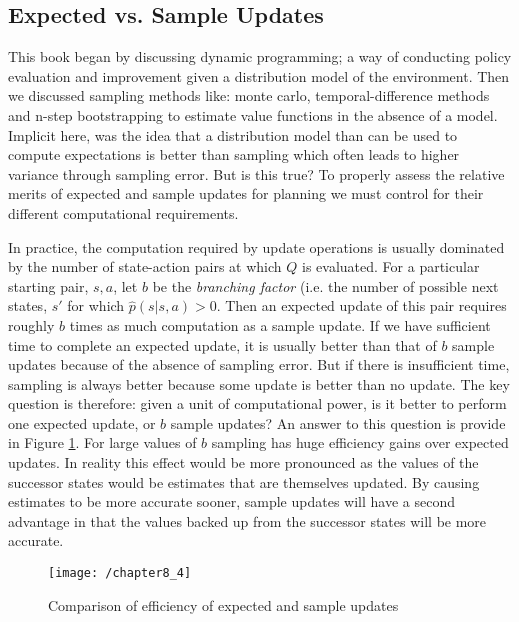 \subsection{Expected vs. Sample Updates}
This book began by discussing dynamic programming; a way of conducting policy evaluation and improvement given a distribution model of the environment. Then we discussed sampling methods like: monte carlo, temporal-difference methods and n-step bootstrapping to estimate value functions in the absence of a model. Implicit here, was the idea that a distribution model than can be used to compute expectations is better than sampling which often leads to higher variance through sampling error. But is this true? To properly assess the relative merits of expected and sample updates for planning we must control for their different computational requirements.

In practice, the computation required by update operations is usually dominated by the number of state-action pairs at which $Q$ is evaluated. For a particular starting pair, $s, a$, let $b$ be the \textit{branching factor} (i.e. the number of possible next states, $s'$ for which $\hat{p}(s|s,a)>0$. Then an expected update of this pair requires roughly $b$ times as much computation as a sample update. If we have sufficient time to complete an expected update, it is usually better than that of $b$ sample updates because of the absence of sampling error. But if there is insufficient time, sampling is always better because some update is better than no update. The key question is therefore: given a unit of computational power, is it better to perform one expected update, or $b$ sample updates? An answer to this question is provide in Figure \ref{fig: samples vs expectations}. For large values of $b$ sampling has huge efficiency gains over expected updates. In reality this effect would be more pronounced as the values of the successor states would be estimates that are themselves updated. By causing estimates to be more accurate sooner, sample updates will have a second advantage in that the values backed up from the successor states will be more accurate.

\begin{figure}
	\centering
	\texttt{[image: /chapter8\_4]}
	\caption{Comparison of efficiency of expected and sample updates}
	\label{fig: samples vs expectations}
\end{figure}

